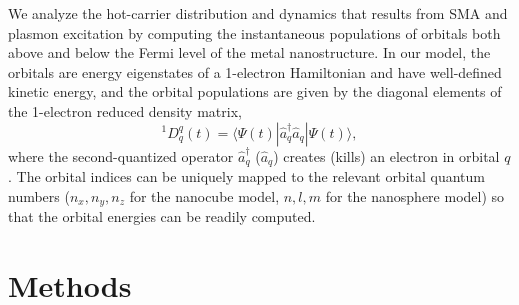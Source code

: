 \documentclass[journal=jpclcd,manuscript=letter]{achemso}
\begin{document}
We analyze the hot-carrier distribution and dynamics that results from SMA and plasmon excitation by computing the 
instantaneous populations of orbitals both above and below the Fermi level of the metal nanostructure.   
In our model, the orbitals are energy eigenstates of a 1-electron Hamiltonian and have well-defined kinetic energy,
and the orbital populations are given by the diagonal elements of the 1-electron reduced density matrix,
\begin{equation}
^1D^q_q(t) = \langle \Psi(t) | \hat{a}^{\dagger}_q \hat{a}_q | \Psi(t) \rangle,
\end{equation} 
where the second-quantized operator $\hat{a}_q^{\dagger}$ ($\hat{a}_q$) creates (kills) an electron
in orbital $q$.  The orbital indices can be uniquely mapped to the relevant orbital quantum numbers ($n_x, n_y, n_z$ for
the nanocube model, $n, l, m$ for the nanosphere model) so that the orbital energies can be readily computed.

\section{Methods}

\end{document}
